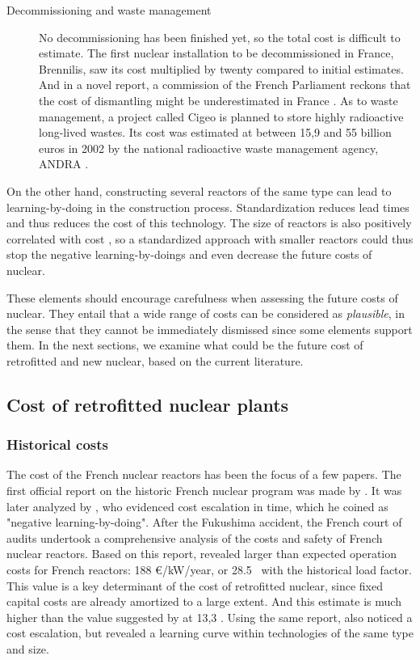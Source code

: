 \begin{description}
	\item [Decommissioning and waste management] No decommissioning has been finished yet, so the total cost is difficult to estimate. The first nuclear installation to be decommissioned in France, Brennilis, saw its cost multiplied by twenty compared to initial estimates. And in a novel report, a commission of the French Parliament reckons that the cost of dismantling might be underestimated in France \citep{AN2017}.
	As to waste management, a project called Cigeo is planned to store highly radioactive long-lived wastes. Its cost was estimated at between 15,9 and 55 billion euros in 2002 by the national radioactive waste management agency, ANDRA \citep[p. 142]{CourdesComptes2012}.
	
\end{description}

On the other hand, constructing several reactors of the same type can lead to learning-by-doing in the construction process. Standardization reduces lead times and thus reduces the cost of this technology. The size of reactors is also positively correlated with cost \citep{Rangel2015}, so a standardized approach with smaller reactors could thus stop the negative learning-by-doings and even decrease the future costs of nuclear.

These elements should encourage carefulness when assessing the future costs of nuclear. They entail that a wide range of costs can be considered as \textit{plausible}, in the sense that they cannot be immediately dismissed since some elements support them. In the next sections, we examine what could be the future cost of retrofitted and new nuclear, based on the current literature.


\subsection{Cost of retrofitted nuclear plants}

\subsubsection{Historical costs}

The cost of the French nuclear reactors has been the focus of a few papers.
The first official report on the historic French nuclear program was made by \citet{Charpin2000}.
It was later analyzed by \citet{Grubler2010}, who evidenced cost escalation in time, which he coined as "negative learning-by-doing".
After the Fukushima accident, the French court of audits undertook a comprehensive analysis of the costs and safety of French nuclear reactors. Based on this report, \citet{Boccard2014} revealed larger than expected operation costs for French reactors: 188 \euro/kW/year, or 28.5 \emwh\ with the historical load factor. This value is a key determinant of the cost of retrofitted nuclear, since fixed capital costs are already amortized to a large extent. And this estimate is much higher than the value suggested by \citet{IEA2015} at 13,3 \emwh.
Using the same report, \citet{Rangel2015} also noticed a cost escalation, but revealed a learning curve within technologies of the same type and size.


